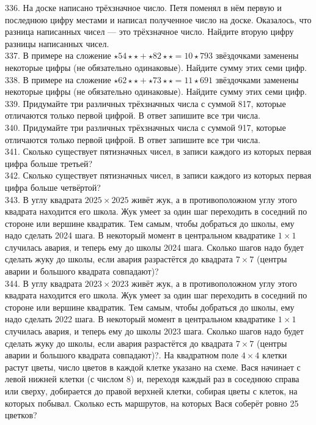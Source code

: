 336. На доске написано трёхзначное число. Петя поменял в нём первую и последнюю цифру местами и написал полученное число на доске. Оказалось, что разница написанных чисел --- это трёхзначное число. Найдите вторую цифру разницы написанных чисел.\\
337. В примере на сложение $\star54\star\star+\star82\star\star=10\star793$ звёздочками заменены некоторые цифры (не обязательно одинаковые). Найдите сумму этих семи цифр.\\
338. В примере на сложение $\star62\star\star+\star73\star\star=11\star691$ звёздочками заменены некоторые цифры (не обязательно одинаковые). Найдите сумму этих семи цифр.\\
339. Придумайте три различных трёхзначных числа с суммой 817, которые отличаются только первой цифрой. В ответ запишите все три числа.\\
340. Придумайте три различных трёхзначных числа с суммой 917, которые отличаются только первой цифрой. В ответ запишите все три числа.\\
341. Сколько существует пятизначных чисел, в записи каждого из которых первая цифра больше третьей?\\
342. Сколько существует пятизначных чисел, в записи каждого из которых первая цифра больше четвёртой?\\
343. В углу квадрата $2025\times2025$ живёт жук, а в противоположном углу этого квадрата находится его школа. Жук умеет за один шаг переходить в соседний по стороне или вершине квадратик. Тем самым, чтобы добраться до школы, ему надо сделать 2024 шага. В некоторый момент в центральном квадратике $1\times1$ случилась авария, и теперь ему до школы 2024 шага. Сколько шагов надо будет сделать жуку до школы, если авария разрастётся до квадрата $7\times7$ (центры аварии и большого квадрата совпадают)?\\
344. В углу квадрата $2023\times2023$ живёт жук, а в противоположном углу этого квадрата находится его школа. Жук умеет за один шаг переходить в соседний по стороне или вершине квадратик. Тем самым, чтобы добраться до школы, ему надо сделать 2022 шага. В некоторый момент в центральном квадратике $1\times1$ случилась авария, и теперь ему до школы 2023 шага. Сколько шагов надо будет сделать жуку до школы, если авария разрастётся до квадрата $7\times7$ (центры аварии и большого квадрата совпадают)?\newpage{}. На квадратном поле $4\times4$ клетки растут цветы, число цветов в каждой клетке указано на схеме. Вася начинает с левой нижней клетки (с числом 8) и, переходя каждый раз в соседнюю справа или сверху, добирается до правой верхней клетки, собирая цветы с клеток, на которых побывал. Сколько есть маршрутов, на которых Вася соберёт ровно 25 цветков?\\
